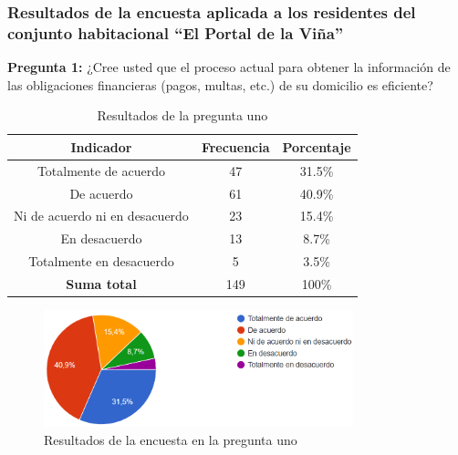 \subsubsection{Resultados de la encuesta aplicada a los residentes del conjunto habitacional {\textquotedblleft}El Portal de la Viña{\textquotedblright}}
\textbf{Pregunta 1:} ¿Cree usted que el proceso actual para obtener la información de las obligaciones financieras (pagos, multas, etc.) de su domicilio es eficiente?
    \begin{table}[H]
        \centering
        \caption{Resultados de la pregunta uno}
        \begin{tabular}{|c|c|c|}
            \hline
            \textbf{Indicador} & \textbf{Frecuencia} &  \textbf{Porcentaje} \\
            \hline
            Totalmente de acuerdo & 47 & 31.5\% \\
            \hline
            De acuerdo & 61 & 40.9\% \\
            \hline
            Ni de acuerdo ni en desacuerdo & 23 & 15.4\% \\
            \hline
            En desacuerdo & 13 & 8.7\% \\
            \hline
            Totalmente en desacuerdo & 5 & 3.5\% \\
            \hline
            \textbf{Suma total} & 149 & 100\% \\
            \hline
        \end{tabular}\label{tab:table}
    \end{table}
    \begin{figure}[H]
              \centering
              \includegraphics[width=0.8\textwidth]{resources/images/p1}
              \caption{Resultados de la encuesta en la pregunta uno}\label{fig:figure_p1}
    \end{figure}


